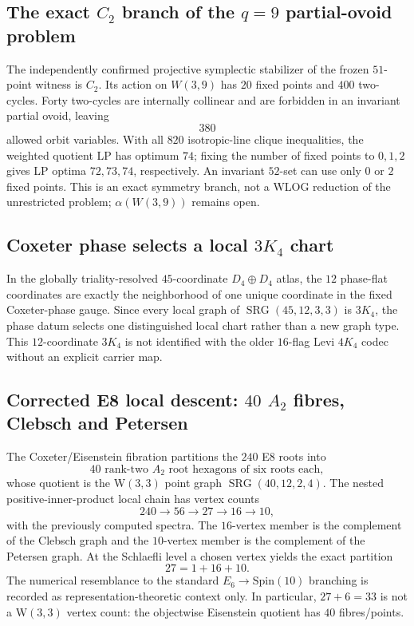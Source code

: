\subsection{The exact $C_2$ branch of the $q=9$ partial-ovoid problem}

The independently confirmed projective symplectic stabilizer of the frozen
$51$-point witness is $C_2$.  Its action on $W(3,9)$ has $20$ fixed points and
$400$ two-cycles.  Forty two-cycles are internally collinear and are forbidden in
an invariant partial ovoid, leaving
\[
 \boxed{380}
\]
allowed orbit variables.  With all $820$ isotropic-line clique inequalities, the
weighted quotient LP has optimum $74$; fixing the number of fixed points to
$0,1,2$ gives LP optima $72,73,74$, respectively.  An invariant $52$-set can use
only $0$ or $2$ fixed points.  This is an exact symmetry branch, not a WLOG
reduction of the unrestricted problem; $\alpha(W(3,9))$ remains open.

\subsection{Coxeter phase selects a local $3K_4$ chart}

In the globally triality-resolved $45$-coordinate $D_4\oplus D_4$ atlas, the $12$
phase-flat coordinates are exactly the neighborhood of one unique coordinate in
the fixed Coxeter-phase gauge.  Since every local graph of
$\operatorname{SRG}(45,12,3,3)$ is $3K_4$, the phase datum selects one distinguished
local chart rather than a new graph type.  This $12$-coordinate $3K_4$ is not
identified with the older $16$-flag Levi $4K_4$ codec without an explicit carrier
map.

\subsection{Corrected E8 local descent: $40$ $A_2$ fibres, Clebsch and Petersen}

The Coxeter/Eisenstein fibration partitions the $240$ E8 roots into
\[
 \boxed{40\text{ rank-two }A_2\text{ root hexagons of six roots each}},
\]
whose quotient is the W$(3,3)$ point graph $\operatorname{SRG}(40,12,2,4)$.
The nested positive-inner-product local chain has vertex counts
\[
 240\to56\to27\to16\to10,
\]
with the previously computed spectra.  The $16$-vertex member is the complement
of the Clebsch graph and the $10$-vertex member is the complement of the Petersen
graph.  At the Schlaefli level a chosen vertex yields the exact partition
\[
 \boxed{27=1+16+10}.
\]
The numerical resemblance to the standard $E_6\to\mathrm{Spin}(10)$ branching is
recorded as representation-theoretic context only.  In particular,
$27+6=33$ is not a W$(3,3)$ vertex count: the objectwise Eisenstein quotient has
$40$ fibres/points.

